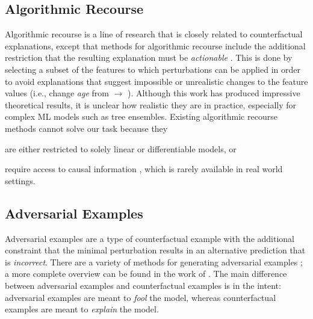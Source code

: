 \subsection{Algorithmic Recourse}
\label{section:focus-recourse}
Algorithmic recourse is a line of research that is closely related to counterfactual explanations, except that methods for algorithmic recourse include the additional restriction that the resulting explanation must be \emph{actionable} \citep{ustun_actionable_2019, joshi_towards_2019, karimi_recourse_2020, karimi_imperfect_causal_2020}. 
This is done by selecting a subset of the features to which perturbations can be applied in order to avoid explanations that suggest impossible or unrealistic changes to the feature values (i.e., change \textit{age} from  $\to$ ). 
Although this work has produced impressive theoretical results, it is unclear how realistic they are in practice, especially for complex ML models such as tree ensembles. 
Existing algorithmic recourse methods cannot solve our task because they 
\begin{enumerate*}[label=(\roman*)]
	\item are either restricted to solely linear \citep{ustun_actionable_2019} or  differentiable \citep{joshi_towards_2019} models, or
	\item  require access to causal information \citep{karimi_recourse_2020, karimi_imperfect_causal_2020}, which is rarely available in real world settings. 
\end{enumerate*}

\subsection{Adversarial Examples}
\label{section:focus-adversarial}
Adversarial examples are a type of counterfactual example with the additional constraint that the minimal perturbation results in an alternative prediction that is \emph{incorrect}. 
There are a variety of methods for generating adversarial examples \citep{goodfellow_explaining_2015,szegedy_intriguing_2014,su_one_2019,brown_adversarial_2018}; a more complete overview can be found in the work of \cite{biggio_wild_2018}. 
The main difference between adversarial examples and counterfactual examples is in the intent: adversarial examples are meant to \emph{fool} the model, whereas counterfactual examples are meant to \emph{explain} the model.


